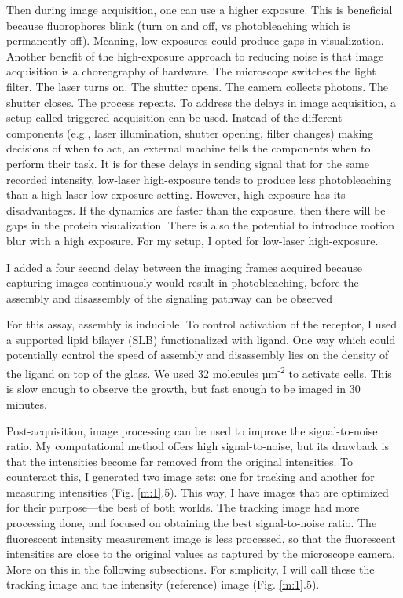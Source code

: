 Then during image acquisition, one can use a higher exposure. This is beneficial because fluorophores blink (turn on and off, vs photobleaching which is permanently off). Meaning, low exposures could produce gaps in visualization. Another benefit of the high-exposure approach to reducing noise is that image acquisition is a choreography of hardware. The microscope switches the light filter. The laser turns on. The shutter opens. The camera collects photons. The shutter closes. The process repeats. To address the delays in image acquisition, a setup called triggered acquisition can be used. Instead of the different components (e.g., laser illumination, shutter opening, filter changes) making decisions of when to act, an external machine tells the components when to perform their task. It is for these delays in sending signal that for the same recorded intensity, low-laser high-exposure tends to produce less photobleaching than a high-laser low-exposure setting. However, high exposure has its disadvantages. If the dynamics are faster than the exposure, then there will be gaps in the protein visualization. There is also the potential to introduce motion blur with a high exposure. For my setup, I opted for low-laser high-exposure.

I added a four second delay between the imaging frames acquired because capturing images continuously would result in photobleaching, before the assembly and disassembly of the signaling pathway can be observed

For this assay, assembly is inducible. To control activation of the receptor, I used a supported lipid bilayer (SLB) functionalized with ligand. One way which could potentially control the speed of assembly and disassembly lies on the density of the ligand on top of the glass. We used 32 molecules µm\textsuperscript{-2} to activate cells. This is slow enough to observe the growth, but fast enough to be imaged in 30 minutes.

Post-acquisition, image processing can be used to improve the signal-to-noise ratio. My computational method offers high signal-to-noise, but its drawback is that the intensities become far removed from the original intensities. To counteract this, I generated two image sets: one for tracking and another for measuring intensities (Fig. \ref{m:1}.5). This way, I have images that are optimized for their purpose—the best of both worlds. The tracking image had more processing done, and focused on obtaining the best signal-to-noise ratio. The fluorescent intensity measurement image is less processed, so that the fluorescent intensities are close to the original values as captured by the microscope camera. More on this in the following subsections. For simplicity, I will call these the tracking image and the intensity (reference) image (Fig. \ref{m:1}.5).


